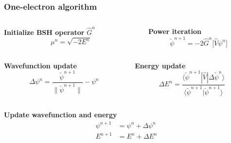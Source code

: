 \documentclass[mathserif, 10pt]{beamer}
\begin{document}
\begin{frame}
    \frametitle{One-electron algorithm}
    \begin{columns}
    \begin{column}{.50\textwidth}
    \centering
    \textbf{Initialize BSH operator} $\hat{G}^n$
    \begin{equation}
        \nonumber
        \mu^n = \sqrt{-2E^n}
    \end{equation}
    \end{column}

    \begin{column}{.50\textwidth}
    \centering
    \textbf{Power iteration}
    \begin{equation}
	\nonumber
	\tilde{\psi}^{n+1} = -2\hat{G}^n \Big[ \hat{V} \psi^n \Big]
    \end{equation}
    \end{column}
    \end{columns}

    \vspace{5mm}

    \begin{columns}
    \begin{column}{.50\textwidth}
    \centering
    \textbf{Wavefunction update}
    \begin{equation}
	\nonumber
	\Delta\psi^n = \frac{\tilde{\psi}^{n+1}}{\|\tilde{\psi}^{n+1}\|} - \psi^n
    \end{equation}
    \end{column}

    \begin{column}{.50\textwidth}
    \centering
    \textbf{Energy update}
    \begin{equation}
	\nonumber
	\Delta E^n =
        \frac{\langle\tilde{\psi}^{n+1}|\hat{V}|\Delta\tilde{\psi}^n\rangle}
        {\langle\tilde{\psi}^{n+1}|\tilde{\psi}^{n+1}\rangle}
    \end{equation}
    \end{column}
    \end{columns}

    \vspace{10mm}

    \centering
    \textbf{Update wavefunction and energy}
    \begin{align}
	\nonumber
        \psi^{n+1}  &= \psi^n + \Delta \psi^n\\
	\nonumber
        E^{n+1}     &= E^n + \Delta E^n
    \end{align}
\end{frame}
\end{document}
